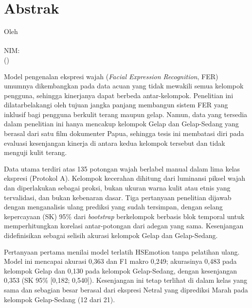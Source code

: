 \chapter*{Abstrak}

\begin{center}
{\bfseries\fontsize{14}{14}\selectfont \ThesisTitleID}

\vspace{1\baselineskip}
Oleh\\
\textbf{\ThesisAuthor}\\
NIM: \ThesisNIM\\
(\ThesisProgramID)
\end{center}

\vspace{1\baselineskip}

Model pengenalan ekspresi wajah (\textit{Facial Expression Recognition}, FER\label{abbr:FER}) umumnya dikembangkan pada data acuan yang tidak mewakili semua kelompok pengguna, sehingga kinerjanya dapat berbeda antar-kelompok. Penelitian ini dilatarbelakangi oleh tujuan jangka panjang membangun sistem FER yang inklusif bagi pengguna berkulit terang maupun gelap. Namun, data yang tersedia dalam penelitian ini hanya mencakup kelompok Gelap dan Gelap-Sedang yang berasal dari satu film dokumenter Papua, sehingga tesis ini membatasi diri pada evaluasi kesenjangan kinerja di antara kedua kelompok tersebut dan tidak menguji kulit terang.

Data utama terdiri atas 135 potongan wajah berlabel manual dalam lima kelas ekspresi (Protokol A). Kelompok kecerahan dihitung dari luminansi piksel wajah dan diperlakukan sebagai proksi, bukan ukuran warna kulit atau etnis yang tervalidasi, dan bukan kebenaran dasar. Tiga pertanyaan penelitian dijawab dengan menganalisis ulang prediksi yang sudah tersimpan, dengan selang kepercayaan (SK) 95\% dari \textit{bootstrap} berkelompok berbasis blok temporal untuk memperhitungkan korelasi antar-potongan dari adegan yang sama. Kesenjangan didefinisikan sebagai selisih akurasi kelompok Gelap dan Gelap-Sedang.

Pertanyaan pertama menilai model terlatih HSEmotion tanpa pelatihan ulang. Model ini mencapai akurasi 0,363 dan F1 makro 0,249; akurasinya 0,483 pada kelompok Gelap dan 0,130 pada kelompok Gelap-Sedang, dengan kesenjangan 0,353 (SK 95\% [0,182; 0,540]). Kesenjangan ini tetap terlihat di dalam kelas yang sama dan sebagian besar berasal dari ekspresi Netral yang diprediksi Marah pada kelompok Gelap-Sedang (12 dari 21).

